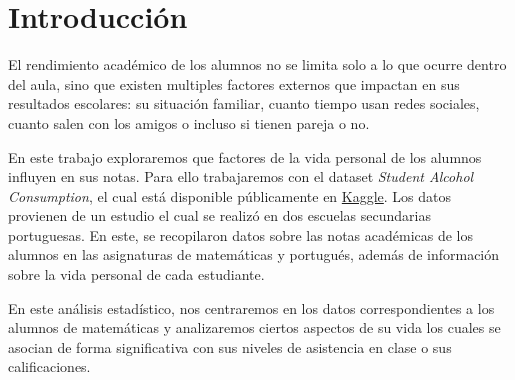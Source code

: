 \chapter{Introducción}

El rendimiento académico de los alumnos no se limita solo a lo que ocurre dentro del aula, sino que existen multiples factores externos que impactan en sus resultados escolares: su situación familiar, cuanto tiempo usan redes sociales, cuanto salen con los amigos o incluso si tienen pareja o no.

En este trabajo exploraremos que factores de la vida personal de los alumnos influyen en sus notas. Para ello trabajaremos con el dataset \textit{Student Alcohol Consumption}, el cual está disponible públicamente en \href{https://www.kaggle.com/datasets/uciml/student-alcohol-consumption}{Kaggle}. Los datos provienen de un estudio \cite{Cortez2008} el cual se realizó en dos escuelas secundarias portuguesas. En este, se recopilaron datos sobre las notas académicas de los alumnos en las asignaturas de matemáticas y portugués, además de información sobre la vida personal de cada estudiante. 

En este análisis estadístico, nos centraremos en los datos correspondientes a los alumnos de matemáticas y analizaremos ciertos aspectos de su vida los cuales se asocian de forma significativa con sus niveles de asistencia en clase o sus calificaciones.

\pagebreak

